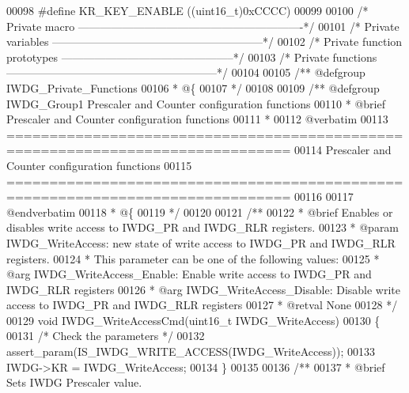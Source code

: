 \begin{DoxyCode}
00098 \textcolor{preprocessor}{#}\textcolor{preprocessor}{define} \textcolor{preprocessor}{KR\_KEY\_ENABLE}    \textcolor{preprocessor}{(}\textcolor{preprocessor}{(}\textcolor{preprocessor}{uint16\_t}\textcolor{preprocessor}{)}0xCCCC\textcolor{preprocessor}{)}
00099 
00100 \textcolor{comment}{/* Private macro -------------------------------------------------------------*/}
00101 \textcolor{comment}{/* Private variables ---------------------------------------------------------*/}
00102 \textcolor{comment}{/* Private function prototypes -----------------------------------------------*/}
00103 \textcolor{comment}{/* Private functions ---------------------------------------------------------*/}
00104 
00105 \textcolor{comment}{/** @defgroup IWDG\_Private\_Functions}
00106 \textcolor{comment}{  * @\{}
00107 \textcolor{comment}{  */}
00108 
00109 \textcolor{comment}{/** @defgroup IWDG\_Group1 Prescaler and Counter configuration functions}
00110 \textcolor{comment}{ *  @brief   Prescaler and Counter configuration functions}
00111 \textcolor{comment}{ *}
00112 \textcolor{comment}{@verbatim   }
00113 \textcolor{comment}{ ===============================================================================}
00114 \textcolor{comment}{                  Prescaler and Counter configuration functions}
00115 \textcolor{comment}{ ===============================================================================  }
00116 \textcolor{comment}{}
00117 \textcolor{comment}{@endverbatim}
00118 \textcolor{comment}{  * @\{}
00119 \textcolor{comment}{  */}
00120 
00121 \textcolor{comment}{/**}
00122 \textcolor{comment}{  * @brief  Enables or disables write access to IWDG\_PR and IWDG\_RLR registers.}
00123 \textcolor{comment}{  * @param  IWDG\_WriteAccess: new state of write access to IWDG\_PR and IWDG\_RLR registers.}
00124 \textcolor{comment}{  *          This parameter can be one of the following values:}
00125 \textcolor{comment}{  *            @arg IWDG\_WriteAccess\_Enable: Enable write access to IWDG\_PR and IWDG\_RLR registers}
00126 \textcolor{comment}{  *            @arg IWDG\_WriteAccess\_Disable: Disable write access to IWDG\_PR and IWDG\_RLR registers}
00127 \textcolor{comment}{  * @retval None}
00128 \textcolor{comment}{  */}
00129 \textcolor{keywordtype}{void} IWDG_WriteAccessCmd(uint16\_t IWDG\_WriteAccess)
00130 \{
00131   \textcolor{comment}{/* Check the parameters */}
00132   assert_param(IS\_IWDG\_WRITE\_ACCESS(IWDG\_WriteAccess));
00133   IWDG->KR = IWDG\_WriteAccess;
00134 \}
00135 
00136 \textcolor{comment}{/**}
00137 \textcolor{comment}{  * @brief  Sets IWDG Prescaler value.}

\end{DoxyCode}
